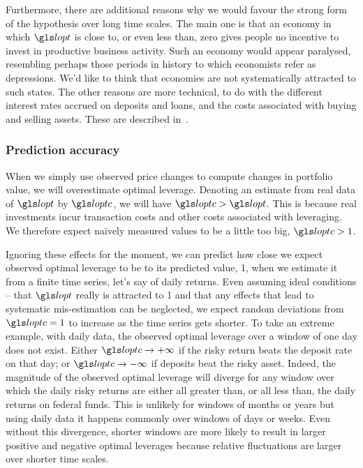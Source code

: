Furthermore, there are additional reasons why we would favour the strong form of the hypothesis over long time scales. The main one is that an economy in which $\lopt$ is close to, or even less than, zero gives people no incentive to invest in productive business activity. Such an economy would appear paralysed, resembling perhaps those periods in history to which economists refer as depressions. We'd like to think that economies are not systematically attracted to such states. The other reasons are more technical, to do with the different interest rates accrued on deposits and loans, and the costs associated with buying and selling assets. These are described in~\cite{PetersAdamou2013}. 


\subsubsection{Prediction accuracy}
When we simply use observed price changes to compute changes in portfolio value, we will overestimate optimal leverage. Denoting an estimate from real data of $\lopt$ by $\loptc$, we will  have $\loptc>\lopt$. This is because real investments incur transaction costs and other costs associated with leveraging. We therefore expect na\"ively measured values to be a little too big, $\loptc>1$. 

Ignoring these effects for the moment, we can predict how close we expect observed optimal leverage to be to its predicted value, 1, when we estimate it from a finite time series, let's say of daily returns. Even assuming ideal conditions -- that $\lopt$ really is attracted to 1 and that any effects that lead to systematic mis-estimation can be neglected, we expect random
deviations from $\loptc=1$ to increase as the time series gets shorter. To take an extreme example, with daily data, the observed optimal leverage over a
window of one day does not exist. Either $\loptc \to+\infty$ if the
risky return beats the deposit rate on that day; or $\loptc \to -\infty$ if
deposits beat the risky asset. Indeed, the magnitude of the observed
optimal leverage will diverge for any window over which the daily
risky returns are either all greater than, or all less than, the daily returns on federal
funds. This is unlikely for windows of months or years but using daily data it happens
commonly over windows of days or weeks. Even without this
divergence, shorter windows are more likely to result in larger
positive and negative optimal leverages because relative fluctuations
are larger over shorter time scales.

